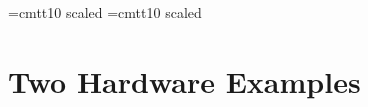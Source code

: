 \sloppy

%


\raggedbottom

\font\largett=cmtt10 scaled
\font\hugett=cmtt10 scaled
\def\opt{{\smaller\sc {\smaller\smaller \&}optional}}
\def\rest{{\smaller\sc {\smaller\smaller \&}rest}}
\def\default#1{[\,{\tt #1}] }
\def\bkt#1{{$\langle$#1$\rangle$}}
\def\SetFigFont#1#2#3{\smaller\smaller\rm}

\renewcommand{\pvstheory}[3]
  {\begin{figure}[htb]\begin{boxedminipage}{\textwidth}%
   {\smaller\smaller\smaller\begin{alltt} \end{alltt}}\end{boxedminipage}%
   \caption{#2}\label{#3}\end{figure}}


\section{Two Hardware Examples}

